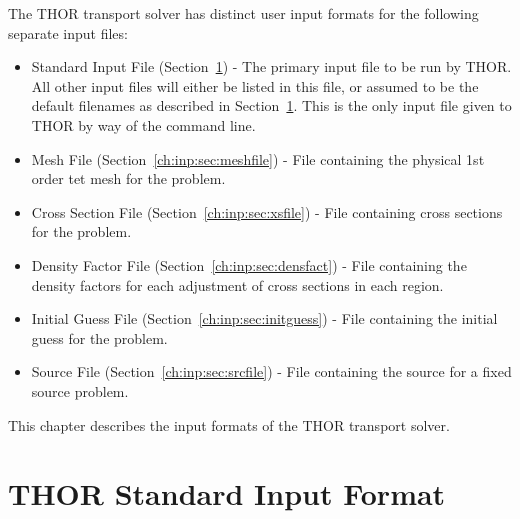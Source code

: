 The \ac{THOR} transport solver has distinct user input formats for the following separate input files:
\begin{itemize}
    \item Standard Input File (Section~\ref{ch:inp:sec:stdinput}) - The primary input file to be run by THOR.
    All other input files will either be listed in this file, or assumed to be the default filenames as described in Section~\ref{ch:inp:sec:stdinput}.
    This is the only input file given to \ac{THOR} by way of the command line.
    \item Mesh File (Section~\ref{ch:inp:sec:meshfile}) - File containing the physical 1st order tet mesh for the problem.
    \item Cross Section File (Section~\ref{ch:inp:sec:xsfile}) - File containing cross sections for the problem.
    \item Density Factor File (Section~\ref{ch:inp:sec:densfact}) - File containing the density factors for each adjustment of cross sections in each region.
    \item Initial Guess File (Section~\ref{ch:inp:sec:initguess}) - File containing the initial guess for the problem.
    \item Source File (Section~\ref{ch:inp:sec:srcfile}) - File containing the source for a fixed source problem.
\end{itemize}

This chapter describes the input formats of the \ac{THOR} transport solver.

\section{THOR Standard Input Format}\label{ch:inp:sec:stdinput}

